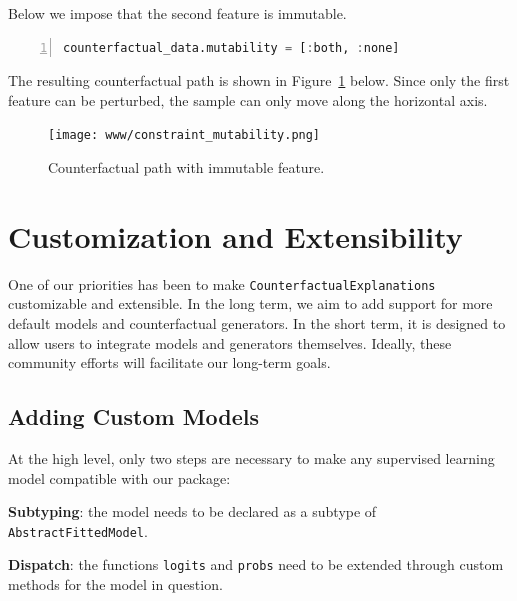\documentclass{juliacon}
\begin{document}
Below we impose that the second feature is immutable.

\begin{lstlisting}[language=Julia, escapechar=@, numbers=left, label={lst:mutability}, caption={}]
counterfactual_data.mutability = [:both, :none]
\end{lstlisting}

The resulting counterfactual path is shown in
Figure~\ref{fig-mutability} below. Since only the first feature can be
perturbed, the sample can only move along the horizontal axis.

\begin{figure}

{\centering \texttt{[image: www/constraint\_mutability.png]}

}

\caption{\label{fig-mutability}Counterfactual path with immutable
feature.}

\end{figure}

\hypertarget{sec-custom}{%
\section{Customization and Extensibility}\label{sec-custom}}

One of our priorities has been to make
\texttt{CounterfactualExplanations} customizable and extensible. In the
long term, we aim to add support for more default models and
counterfactual generators. In the short term, it is designed to allow
users to integrate models and generators themselves. Ideally, these
community efforts will facilitate our long-term goals.

\hypertarget{sec-custom-mod}{%
\subsection{Adding Custom Models}\label{sec-custom-mod}}

At the high level, only two steps are necessary to make any supervised
learning model compatible with our package:

\begin{unnumlist}
\item \textbf{Subtyping}: the model needs to be declared as a subtype of \texttt{AbstractFittedModel}.
\item \textbf{Dispatch}: the functions \texttt{logits} and \texttt{probs} need to be extended through custom methods for the model in question.
\end{unnumlist}
\end{document}
